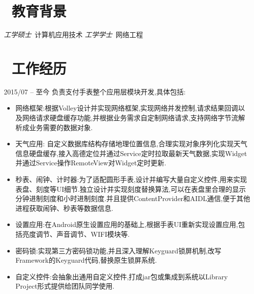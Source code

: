 \documentclass{resume}
\begin{document}


 
\section{\faGraduationCap\  教育背景}
\textit{工学硕士}\ 计算机应用技术
\textit{工学学士}\ 网络工程


\section{\faUsers\ 工作经历}
 {2015/07 -- 至今}
负责支付手表整个应用层模块开发,具体包括:
\begin{itemize}
  \item 网络框架:根据Volley设计并实现网络框架,实现网络并发控制,请求结果回调以及网络请求硬盘缓存功能,并根据业务需求自定制网络请求,支持网络字节流解析成业务需要的数据对象.
  \item 天气应用: 自定义数据库结构存储地理位置信息,合理实现对象序列化实现天气信息硬盘缓存,接入高德定位并通过Service定时拉取最新天气数据,实现Widget并通过Service操作RemoteView对Widget定时更新.
  \item 秒表、闹钟、计时器:为了适配圆形手表,设计并编写大量自定义控件,用来实现表盘、刻度等UI细节.独立设计并实现刻度替换算法,可以在表盘里合理的显示分钟进制刻度和小时进制刻度.并且提供ContentProvider和AIDL通信,便于其他进程获取闹钟、秒表等数据信息. 
  \item 设置应用:在Android原生设置应用的基础上,根据手表UI重新实现设置应用,包括亮度调节、声音调节、WIFI模块等.
  \item 密码锁:实现第三方密码锁功能,并且深入理解Keyguard锁屏机制,改写Framework的Keyguard代码,替换原生锁屏系统.
  \item 自定义控件:会抽象出通用自定义控件,打成jar包或集成到系统以Library Project形式提供给团队同学使用.
\end{itemize}
\end{document}

